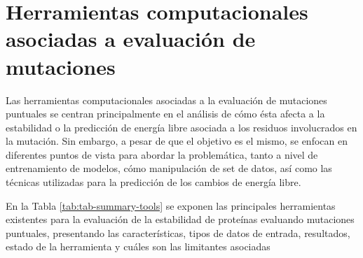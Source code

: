 \section{Herramientas computacionales asociadas a evaluación de mutaciones}

Las herramientas computacionales asociadas a la evaluación de mutaciones puntuales se centran principalmente en el análisis de cómo ésta afecta a la estabilidad o la predicción de energía libre asociada a los residuos involucrados en la mutación. Sin embargo, a pesar de que el objetivo es el mismo, se enfocan en diferentes puntos de vista para abordar la problemática, tanto a nivel de entrenamiento de modelos, cómo manipulación de set de datos, así como las técnicas utilizadas para la predicción de los cambios de energía libre.

En la Tabla \ref{tab:tab-summary-tools} se exponen las principales herramientas existentes para la evaluación de la estabilidad de proteínas evaluando mutaciones puntuales, presentando las características, tipos de datos de entrada, resultados, estado de la herramienta y cuáles son las limitantes asociadas

